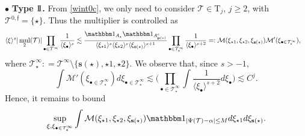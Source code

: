 \documentclass[%
11pt,  reqno]{amsart}
\newcommand{\jap}[1]{\langle #1 \rangle}
\newcommand{\II}{\textup{I \hspace{-2.9mm} I} }
\newcommand{\5}{\textup{V}}
\newcommand{\noi}{\noindent}
\newcommand{\ind}{\mathbbm 1}
\newcommand{\les}{\lesssim}
\theoremstyle{remark}
\newcommand{\bul}{\bullet}
\newcommand{\TT}{\mathcal{T}}
\newcommand{\Tr}{\mathrm{T}}
\newcommand{\al}{\alpha}
\newcommand{\gfrak}{\mathfrak{g}}
\newcommand{\pb}{\mathbf{p}}
\newcommand{\sbf}{\mathbf{s}}
\newcommand{\ges}{\gtrsim}
\newcommand{\jb}[1]
{\langle #1 \rangle}
\newcommand{\ff}{\mathfrak{f}}
\DeclareMathOperator{\mul}{mul}
\numberwithin{equation}{section}
\numberwithin{theorem}{section}
\begin{document}
\medskip 
\noi
$\bul$ \textbf{Type $\II$.} From \eqref{wint0c}, we only need to consider $\TT\in \Tr_j$, $j\ge 2$, with $\TT^{0,\ff}=\{\star\}$. Thus the multiplier is controlled as
\begin{align}\label{L22}
\jb{\xi}^s |\mul_2(\TT)| \prod_{\bul \in \TT^\infty} \frac{1}{\jb{\xi_\bul}^s}
&
\les \frac{ \ind_{A_\star} \ind_{A^c_{\pb(\star)}} }{ \jb{\xi_{\star1}}^s \jb{\xi_{\star2}}^s  \jb{\xi_{\sbf(\star)}}^{s+1} } \prod_{\bul \in \TT^{\infty}_\star } \frac{1}{\jb{\xi_{\bul}}^{s+2}}=:\mathcal{M}(\xi_{\star1}, \xi_{\star2}, \xi_{\sbf(\star)})\mathcal{M}'(\xi_{\bul\in \TT^\infty_\star}) 
,
\end{align}
 where 
 $\TT^\infty_\star : = \TT^\infty\setminus \{\sbf(\star), \star1, \star2\}$.
% 
% 
% 
%
%
We observe that, since $s>-1$,
\begin{equation}\label{eq:estMlinha}
    \int \mathcal{M}'(\xi_{\bul\in \TT^\infty_\star})  d\xi_{\bul\in\TT^\infty_\star} \lesssim \bigg(
\prod_{\bul \in \TT^\infty_\star }
\int \frac{1}{ \jb{\xi_{\bul}}^{s+2} } d\xi_{\bul} \bigg)  \lesssim C^j.
\end{equation}
Hence, it remains to bound
\begin{align}
\label{IIbb}
\sup_{\xi, \xi_{\bul\in\TT^\infty_\star}}
\int \mathcal{M}(\xi_{\star1}, \xi_{\star2}, \xi_{\sbf(\star)})\ind_{|\Psi(\TT) - \al| \le M} d\xi_{\star1} d\xi_{\sbf(\star)}.
\end{align}
\end{document}
